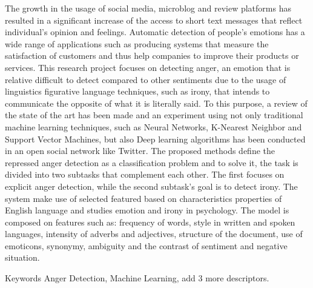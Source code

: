 The growth in the usage of social media, microblog and review platforms has resulted in a significant increase of the access to short text messages that reflect individual's opinion and feelings. Automatic detection of people's emotions has a wide range of applications such as producing systems that measure the satisfaction of customers and thus help companies to improve their products or services. This research project focuses on detecting anger, an emotion that is relative difficult to detect compared to other sentiments due to the usage of linguistics figurative language techniques, such as irony, that intends to communicate the opposite of what it is literally said.
To this purpose, a review of the state of the art has been made and an experiment using not only traditional machine learning techniques, such as Neural Networks, K-Nearest Neighbor and Support Vector Machines, but also Deep learning algorithms has been conducted in an open social network like Twitter.
The proposed methods define the repressed anger detection as a classification problem and to solve it, the task is divided into two subtasks that complement each other. The first focuses on explicit anger detection, while the second subtask's goal is to detect irony. The system make use of selected featured based on characteristics properties of English language and studies emotion and irony in psychology. The model is composed on features such as: frequency of words, style in written and spoken languages, intensity of adverbs and adjectives, structure of the document, use of emoticons, synonymy, ambiguity and the contrast of sentiment and negative situation.

Keywords
Anger Detection, Machine Learning, add 3 more descriptors.